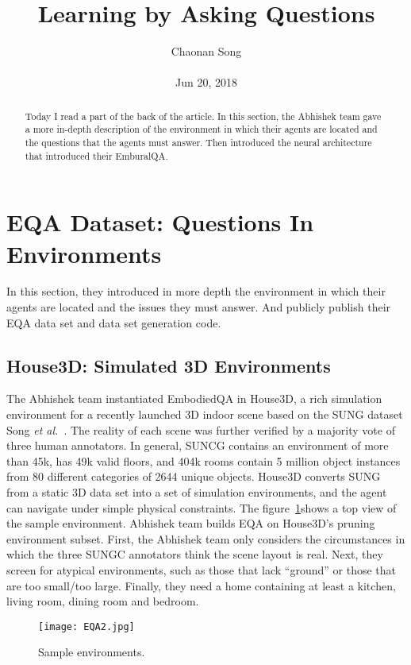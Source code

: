 \documentclass[10pt,twocolumn,letterpaper]{article}
\author{Chaonan Song \\\\
Jun 20, 2018}
\title{Learning by Asking Questions}
\begin{document}
    \maketitle
        \begin{abstract}
        Today I read a part of the back of the article. In this section, the Abhishek team gave a more in-depth description of the environment in which their agents are located and the questions that the agents must answer. Then introduced the neural architecture that introduced their EmburalQA.
        \end{abstract}
        \section{EQA Dataset: Questions In Environments}
        In this section, they introduced in more depth the environment in which their agents are located and the issues they must answer. And publicly publish their EQA data set and data set generation code.
        \subsection{House3D: Simulated 3D Environments}
        The Abhishek team instantiated EmbodiedQA in House3D, a rich simulation environment for a recently launched 3D indoor scene based on the SUNG dataset Song \emph{et al.}~\cite{[8]}. The reality of each scene was further verified by a majority vote of three human annotators. In general, SUNCG contains an environment of more than 45k, has 49k valid floors, and 404k rooms contain 5 million object instances from 80 different categories of 2644 unique objects. House3D converts SUNG from a static 3D data set into a set of simulation environments, and the agent can navigate under simple physical constraints. The figure~\ref{fig2a}shows a top view of the sample environment. Abhishek team builds EQA on House3D's pruning environment subset. First, the Abhishek team only considers the circumstances in which the three SUNGC annotators think the scene layout is real. Next, they screen for atypical environments, such as those that lack ``ground'' or those that are too small/too large. Finally, they need a home containing at least a kitchen, living room, dining room and bedroom.

        \begin{figure}[htbp]
            \centering
            \texttt{[image: EQA2.jpg]}
            \caption{Sample environments.}
            \label{fig2a}
       \end{figure}
\end{document}

